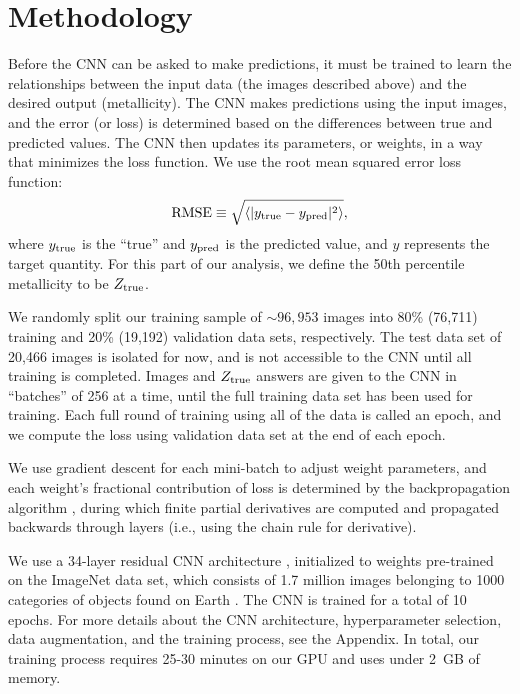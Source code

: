\documentclass[fleqn,usenatbib]{mnras}
\newcommand{\editorial}[1]{\textcolor{red}{#1}}
\begin{document}
\section{Methodology}\label{sec:training}
Before the CNN can be asked to make predictions, it must be trained to learn the relationships between the input data (the images described above) and the desired output (metallicity). The CNN makes predictions using the input images, and the error (or loss) is determined based on the differences between true and predicted values. The CNN then updates its parameters, or weights, in a way that minimizes the loss function. We use the root mean squared error loss function:
\begin{equation}
\mathrm{RMSE} \equiv \sqrt{\langle |y_{\rm true} - y_{\rm pred}|^2\rangle},
\end{equation}
where $y_{\rm true}$ is the ``true'' and $y_{\rm pred}$ is the predicted value, and $y$ represents the target quantity. For this part of our analysis, we define the 50th percentile \cite{Tremonti2004} metallicity to be $Z_{\rm true}$.

We randomly split our training sample of $\sim 96,953$ images into 80\% (76,711) training and 20\% (19,192) validation data sets, respectively. The test data set of 20,466 images is isolated for now, and is not accessible to the CNN until all training is completed. Images and $Z_{\rm true}$ answers are given to the CNN in ``batches'' of 256 at a time, until the full training data set has been used for training. Each full round of training using all of the data is called an epoch, and we compute the loss using validation data set at the end of each epoch.

We use gradient descent for each mini-batch to adjust weight parameters, and each weight's fractional contribution of loss is determined by the backpropagation algorithm \citep{LeCun1989}, during which finite partial derivatives are computed and propagated backwards through layers (i.e., using the chain rule for derivative). %

We use a 34-layer residual CNN architecture \citep{He2015}, initialized to weights pre-trained on the ImageNet data set, which consists of 1.7 million images belonging to 1000 categories of objects found on Earth \citep[e.g., cats, horses, cars, or books;][]{ImageNet}.
The CNN is trained for a total of 10 epochs.
For more details about the CNN architecture, hyperparameter selection, data augmentation, and the training process, see the Appendix.
In total, our training process requires 25-30 minutes on our GPU and uses under 2~GB of memory.
\end{document}
